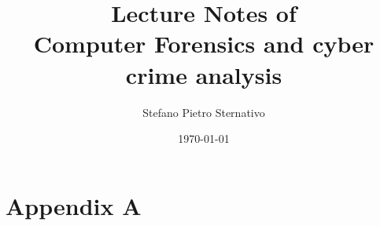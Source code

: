 \documentclass[a4paper,12pt]{article} %
\title{Lecture Notes of \\Computer Forensics and cyber crime analysis}
\author{Stefano Pietro Sternativo}
\date{\today}
\begin{document}
\maketitlecustom %

\tableofcontents %
\newpage

\def\slides{slides/sample-2.pdf}





























\appendix
\section{Appendix A}
\end{document}
